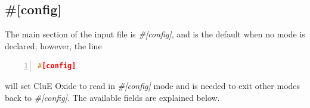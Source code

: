 \documentclass{book}
\begin{document}
\subsection{\#[config]}
The main section of the input file is \textit{\#[config]}, and is the default
when no mode is declared; however, the line
\begin{lstlisting}[frame=single,numbers=left,language=c]
#[config]
\end{lstlisting}
will set CluE Oxide to read in \textit{\#[config]} mode and is needed to exit
other modes back to \textit{\#[config]}.
The available fields are explained below.  
\end{document}
